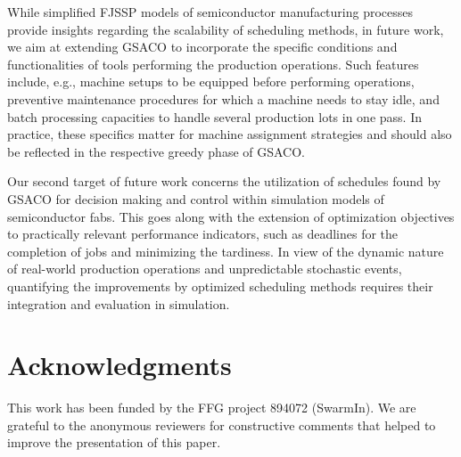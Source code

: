 \documentclass[runningheads]{llncs}
\begin{document}
While simplified FJSSP models of semiconductor manufacturing processes
provide insights regarding the scalability of scheduling methods,
in future work, we aim at extending GSACO to incorporate the specific
conditions and functionalities of tools performing the production operations.
Such features include, e.g.,
machine setups to be equipped before performing operations,
preventive maintenance procedures for which a machine needs to stay idle, and
batch processing capacities to handle several production lots in one pass.
In practice, these specifics matter for machine assignment strategies
and should also be reflected in the respective greedy phase of GSACO.

Our second target of future work concerns the utilization of schedules 
found by GSACO for decision making and control within simulation models
of semiconductor fabs.
This goes along with the extension of optimization objectives to
practically relevant performance indicators, such as deadlines for the
completion of jobs and minimizing the tardiness.
In view of the dynamic nature of real-world production operations and
unpredictable stochastic events,
quantifying the improvements by optimized scheduling methods
requires their integration and evaluation in simulation.


\section*{Acknowledgments}

This work has been funded by the FFG project 894072 (SwarmIn).
We are grateful to the anonymous reviewers for constructive 
comments that helped to improve the presentation of this paper.




%
%
%
% 
% 
%

\end{document}
